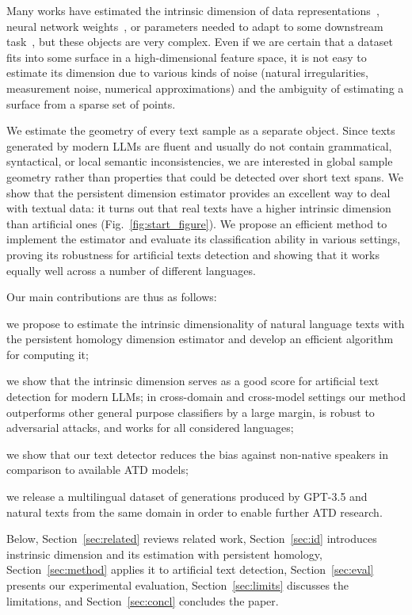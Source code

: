 \documentclass{article}
\begin{document}
Many works have estimated the intrinsic dimension of data representations~\citep{pope2021the, NEURIPS2021_3bc31a43}, neural network weights~\citep{ansuini2019intrinsic}, or parameters needed to adapt to some downstream task~\citep{aghajanyan-etal-2021-intrinsic}, but these objects are very complex.
Even if we are certain that a dataset fits into some surface in a high-dimensional feature space, it is not easy to estimate its dimension due to various kinds of noise (natural irregularities, measurement noise, numerical approximations) and the ambiguity of estimating a surface from a sparse set of points. 

We estimate the geometry of every text sample as a separate object. 
Since texts generated by modern LLMs are fluent and usually do not contain grammatical, syntactical, or local semantic inconsistencies, we are interested in global sample geometry rather than properties that could be detected over short text spans. 
We show that the persistent dimension estimator provides an excellent way to deal with textual data: it turns out that real texts have a higher intrinsic dimension than artificial ones (Fig.~\ref{fig:start_figure}). We propose an efficient method to implement the estimator and evaluate its classification ability in various settings, proving its robustness for artificial texts detection and showing that it
works equally well across a number of different languages.

Our main contributions are thus as follows:
 \begin{inparaenum}[(1)]
     \item we propose to estimate the intrinsic dimensionality of natural language texts with the persistent homology dimension estimator and develop an efficient algorithm for computing it;
     \item we show that the intrinsic dimension serves as a good score for artificial text detection for modern LLMs; in cross-domain and cross-model settings our method outperforms other general purpose classifiers by a large margin, is robust to adversarial attacks, and works for all considered languages;
     \item we show that our text detector reduces the bias against non-native speakers in comparison to available ATD models;
     \item we release a multilingual dataset of generations produced by GPT-3.5 and natural texts from the same domain in order to enable further ATD research. 
 \end{inparaenum}
Below, Section~\ref{sec:related} reviews related work, Section~\ref{sec:id} introduces instrinsic dimension and its estimation with persistent homology, Section~\ref{sec:method} applies it to artificial text detection, Section~\ref{sec:eval} presents our experimental evaluation, Section~\ref{sec:limits} discusses the limitations, and Section~\ref{sec:concl} concludes the paper.
\end{document}
